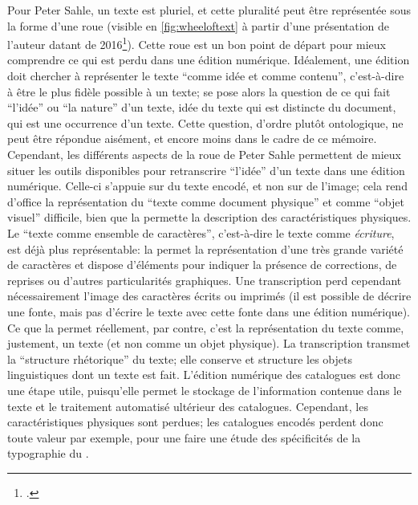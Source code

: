 Pour Peter Sahle, un texte est pluriel, et cette pluralité peut être représentée sous la forme d'une roue (visible en \ref{fig:wheeloftext} à partir d'une présentation de l'auteur datant de 2016\footcite[p. 21]{sahle_what_2016}). Cette roue est un bon point de départ pour mieux comprendre ce qui est perdu dans une édition numérique. Idéalement, une édition \tei{} doit chercher à représenter le texte \enquote{comme idée et comme contenu}, c'est-à-dire à être le plus fidèle possible à un texte; se pose alors la question de ce qui fait \enquote{l'idée} ou \enquote{la nature} d'un texte, idée du texte qui est distincte du document, qui est une occurrence d'un texte. Cette question, d'ordre plutôt ontologique, ne peut être répondue aisément, et encore moins dans le cadre de ce mémoire. Cependant, les différents aspects de la roue de Peter Sahle permettent de mieux situer les outils disponibles pour retranscrire \enquote{l'idée} d'un texte dans une édition numérique. Celle-ci s'appuie sur du texte encodé, et non sur de l'image; cela rend d'office la représentation du \enquote{texte comme document physique} et comme \enquote{objet visuel} difficile, bien que la \tei{} permette la description des caractéristiques physiques. Le \enquote{texte comme ensemble de caractères}, c'est-à-dire le texte comme \textit{écriture}, est déjà plus représentable: la \tei{} permet la représentation d'une très grande variété de caractères et dispose d'éléments pour indiquer la présence de corrections, de reprises ou d'autres particularités graphiques. Une transcription perd cependant nécessairement l'image des caractères écrits ou imprimés (il est possible de décrire une fonte, mais pas d'écrire le texte avec cette fonte dans une édition numérique). Ce que la \tei{} permet réellement, par contre, c'est la représentation du texte comme, justement, un texte (et non comme un objet physique). La transcription transmet la \enquote{structure rhétorique} du texte; elle conserve et structure les objets linguistiques dont un texte est fait. L'édition numérique des catalogues est donc une étape utile, puisqu'elle permet le stockage de l'information contenue dans le texte et le traitement automatisé ultérieur des catalogues. Cependant, les caractéristiques physiques sont perdues; les catalogues encodés perdent donc toute valeur par exemple, pour une faire une étude des spécificités de la typographie du .

